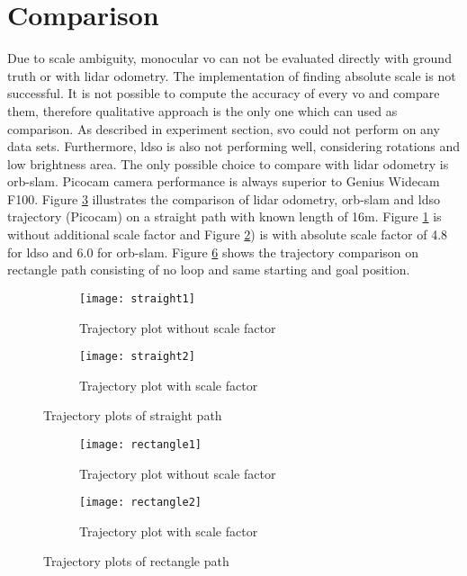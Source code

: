 \section{Comparison}
Due to scale ambiguity, monocular \acrshort{vo} can not be evaluated directly with ground truth or with \acrshort{lidar} odometry. The implementation of finding absolute scale is not successful. It is not possible to compute the accuracy of every \acrshort{vo} and compare them, therefore qualitative approach is the only one which can used as comparison. As described in experiment section, \acrshort{svo} could not perform on any data sets. Furthermore, \acrshort{ldso} is also not performing well, considering rotations and low brightness area. The only possible choice to compare with \acrshort{lidar} odometry is \acrshort{orb}-\acrshort{slam}. Picocam camera performance is always superior to Genius Widecam F100. Figure \ref{fig:straight} illustrates the comparison of \acrshort{lidar} odometry, \acrshort{orb}-\acrshort{slam} and \acrshort{ldso} trajectory (Picocam) on a straight path with known length of 16m. Figure \ref{fig:straight1} is without additional scale factor and Figure \ref{fig:straight2}) is with absolute scale factor of 4.8  for \acrshort{ldso} and 6.0  for \acrshort{orb}-\acrshort{slam}. Figure \ref{fig:rectangle} shows the trajectory comparison on rectangle path consisting of no loop and same starting and goal position.   
\begin{figure}[H]
	\begin{subfigure}{.5\textwidth}
		\texttt{[image: straight1]}
		\caption{Trajectory plot without scale factor}
		\label{fig:straight1}
	\end{subfigure}
	\begin{subfigure}{.5\textwidth}
		\texttt{[image: straight2]}
		\caption{Trajectory plot with scale factor}
		\label{fig:straight2}
	\end{subfigure}
	\caption{Trajectory plots of straight path}
	\label{fig:straight}
\end{figure}

\begin{figure}[H]
	\begin{subfigure}{.5\textwidth}
		\texttt{[image: rectangle1]}
		\caption{Trajectory plot without scale factor}
		\label{fig:rectangle1}
	\end{subfigure}
	\begin{subfigure}{.5\textwidth}
		\texttt{[image: rectangle2]}
		\caption{Trajectory plot with scale factor}
		\label{fig:rectangle2}
	\end{subfigure}
	\caption{Trajectory plots of rectangle path}
	\label{fig:rectangle}
\end{figure}

